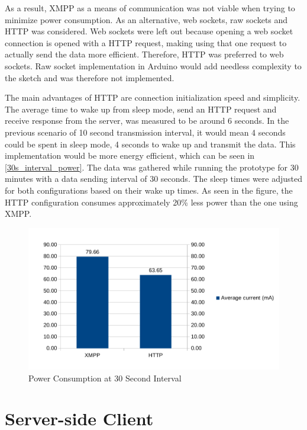 As a result, XMPP as a means of communication was not viable when trying to minimize power consumption. As an alternative,  web sockets, raw sockets and HTTP was considered. Web sockets were left out because opening a web socket connection is opened with a HTTP request, making using that one request to actually send the data more efficient. Therefore, HTTP was preferred to web sockets. Raw socket implementation in Arduino would add needless complexity to the sketch and was therefore not implemented. 

The main advantages of HTTP are connection initialization speed and simplicity. The average time to wake up from sleep mode, send an HTTP request and receive response from the server, was measured to be around 6 seconds. In the previous scenario of 10 second transmission interval, it would mean 4 seconds could be spent in sleep mode, 4 seconds to wake up and transmit the data. This implementation would be more energy efficient, which can be seen in \autoref{30s_interval_power}. The data was gathered while running the prototype for 30 minutes with a data sending interval of 30 seconds. The sleep times were adjusted for both configurations based on their wake up times. As seen in the figure, the HTTP configuration consumes approximately 20\% less power than the one using XMPP. 


\begin{figure}[h]
\centering
\includegraphics[scale=0.9]{4/figures/30s_xmpp_vs_http.pdf}
\caption{Power Consumption at 30 Second Interval}
\label{30s_interval_power}
\end{figure}

\section{Server-side Client}

